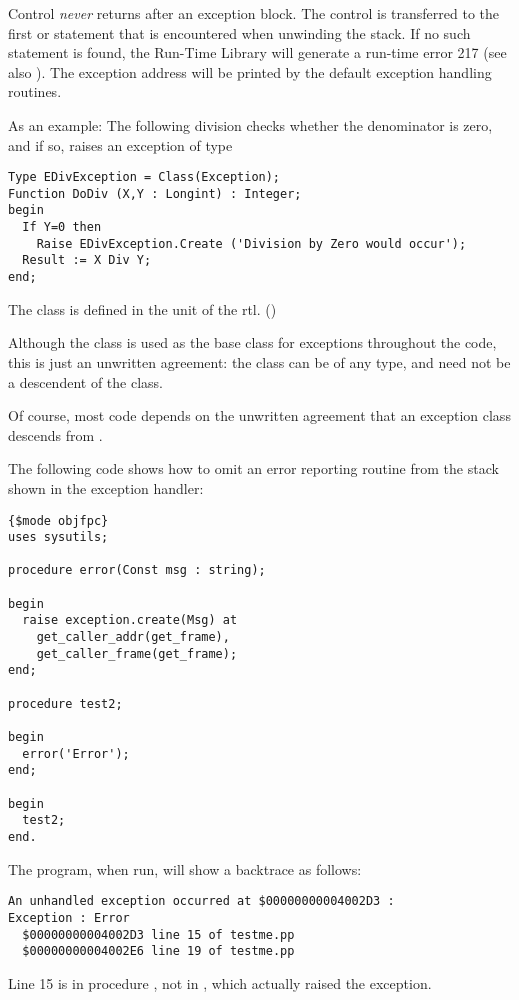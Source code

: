 \begin{remark} Control {\em never} returns after an exception block. The
control is transferred to the first  or
 statement that is encountered when unwinding the stack.
If no such statement is found, the \fpc Run-Time Library will generate a
run-time error 217 (see also ). The exception address
will be printed by the default exception handling routines.
\end{remark}

As an example: The following division checks whether the denominator is
zero, and if so, raises an exception of type 
\begin{verbatim}
Type EDivException = Class(Exception);
Function DoDiv (X,Y : Longint) : Integer;
begin
  If Y=0 then
    Raise EDivException.Create ('Division by Zero would occur');
  Result := X Div Y;
end;
\end{verbatim}
The class  is defined in the  unit of the rtl.
()

\begin{remark}
Although the  class is used as the base class for exceptions
throughout the code, this is just an unwritten agreement: the class can
be of any type, and need not be a descendent of the  class.

Of course, most code depends on the unwritten agreement that an exception
class descends from .
\end{remark}

The following code shows how to omit an error reporting routine from the
stack shown in the exception handler:
\begin{verbatim}
{$mode objfpc}
uses sysutils;

procedure error(Const msg : string);

begin
  raise exception.create(Msg) at
    get_caller_addr(get_frame),
    get_caller_frame(get_frame);
end;

procedure test2;

begin
  error('Error');
end;

begin
  test2;
end.
\end{verbatim}
The program, when run, will show a backtrace as follows:
\begin{verbatim}
An unhandled exception occurred at $00000000004002D3 :
Exception : Error
  $00000000004002D3 line 15 of testme.pp
  $00000000004002E6 line 19 of testme.pp
\end{verbatim}
Line 15 is in procedure , not in , which actually raised the exception.

